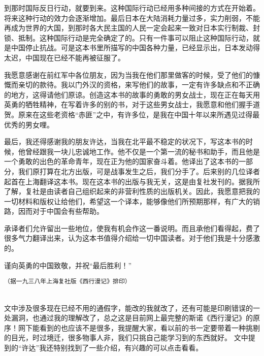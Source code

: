 \documentclass[10pt]{book}
\begin{document}
到那时国际反日行动，就要到来。这种国际行动已经用多种间接的方式在开始着。将来这种行动的效力会逐渐增加。最后日本在大陆消耗力量过多，实力削弱，不能再成为世界的大国，到那时各大民主国的人民一定会起来一致对日本实行制裁、封锁、抵制。这种国际行动是完全确定了的。只有一件事可以阻止这种国际行动，就是中国停止抗战。可是这本书里所描写的中国各种力量，已经显示出，日本发动得太迟，中国现在已经不能再被征服了。

我愿意感谢在前红军中各位朋友，因为当我在他们那里做客的时候，受了他们的慷慨而亲切的款待。我以门外汉的资格，来写他们的故事，一定有许多缺点和不正确的地方，这得请他们原谅。创造这本书的故事的勇敢的男女战士，现在正在每天用英勇的牺牲精神，在写着许多的别的书，对于这些男女战士，我愿意和他们握手道贺。原来在这些老资格“赤匪”之中，有许多位，是我在中国十年以来所遇见过得最优秀的男女哩。

最后，我还得感谢我的朋友许达，当我在北平最不稳定的状况下，写这本书的时候，他曾经跟我一块儿忠诚地工作。他不仅是一个第一流的秘书和助手，而且他是一个勇敢的出色的革命青年，现在正为他的国家奋斗着。他译出了这本书的一部分，我们原打算在北方出版，可是战事发生之后，我们分手了。后来别的几位译者起首在上海翻译这本书。现在这本书的出版与我无关，这是由复社发刊的。据我所了解，复社是由读者自己组织起来的非营利性质的出版机关。因此，我愿意把我的一切材料和版权让给他们，希望这一个译本，能够像他们所预期那样，有广大的销路，因而对于中国会有些帮助。

承译者们允许留出一些地位，使我有机会作这一番说明。而且承他们看得起，费了很多气力翻译出来，认为这本书值得介绍给一切中国读者。对于他们我是十分感激的。

谨向英勇的中国致敬，并祝“最后胜利！”



\newpage

\texttt{（据一九三八年上海复社版《西行漫记》排印）}

~\\

文中涉及很多现在已经不用的通假字，能改的我就改了，还有可能是印刷错误的一处漏洞，也通过我的理解改了，总之这是目前网上最完整的斯诺《西行漫记》的原序！网下能看到的也应该不是很多，我提醒大家，看以前的书一定要带着一种挑剔的目光，时过境迁，很多物事人非，我们只挑自己能学习到的东西就好。 文中提到的“许达”我还特别找到了一些介绍，有兴趣的可以点击看看。

~\\


\end{document}
